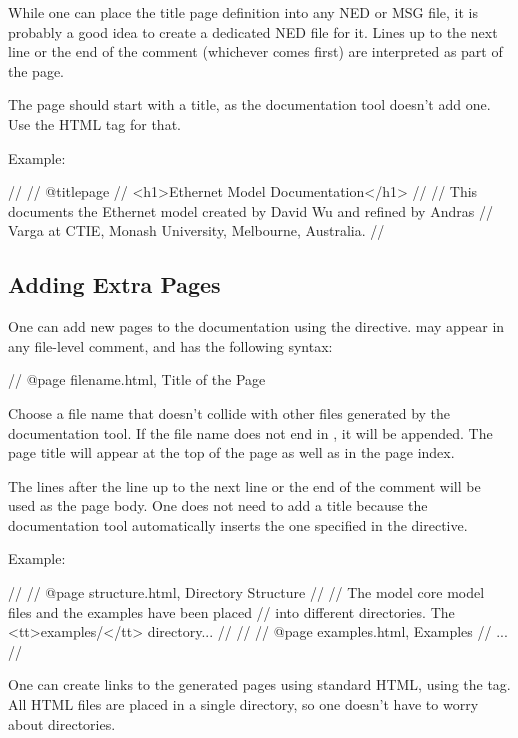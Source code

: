 While one can place the title page definition into any NED or MSG file, it is
probably a good idea to create a dedicated NED file for it. Lines up to the
next  line or the end of the comment (whichever comes first) are
interpreted as part of the page.

The page should start with a title, as the documentation tool doesn't add
one. Use the  HTML tag for that.

Example:

\begin{ned}
//
// @titlepage
// <h1>Ethernet Model Documentation</h1>
//
// This documents the Ethernet model created by David Wu and refined by Andras
// Varga at CTIE, Monash University, Melbourne, Australia.
//
\end{ned}


\subsection{Adding Extra Pages}
\label{sec:neddoc:adding-extra-pages}

One can add new pages to the documentation using the  directive.
 may appear in any file-level comment, and has the following
syntax:

\begin{ned}
// @page filename.html, Title of the Page
\end{ned}

Choose a file name that doesn't collide with other files generated
by the documentation tool. If the file name does not end in ,
it will be appended. The page title will appear at the top of
the page as well as in the page index.

The lines after the  line up to the next  line or the
end of the comment will be used as the page body. One does not need to add
a title because the documentation tool automatically inserts the one
specified in the  directive.

Example:
\begin{ned}
//
// @page structure.html, Directory Structure
//
// The model core model files and the examples have been placed
// into different directories. The <tt>examples/</tt> directory...
//
//
// @page examples.html, Examples
// ...
//
\end{ned}

One can create links to the generated pages using standard HTML,
using the  tag. All HTML files are
placed in a single directory, so one doesn't have to worry about
directories.

